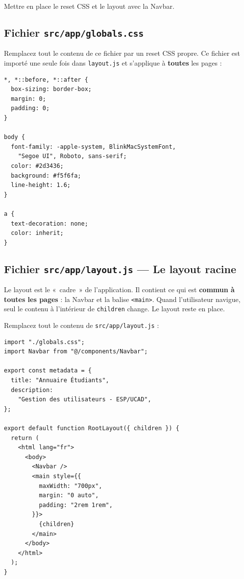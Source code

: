 \documentclass[11pt,a4paper]{article}
\begin{document}
\begin{objectifbox}
Mettre en place le reset CSS et le layout avec la Navbar.
\end{objectifbox}

\subsection{Fichier \texttt{src/app/globals.css}}

Remplacez tout le contenu de ce fichier par un reset CSS propre. Ce fichier est importé une seule fois dans \texttt{layout.js} et s'applique à \textbf{toutes} les pages :

\begin{lstlisting}[style=css]
*, *::before, *::after {
  box-sizing: border-box;
  margin: 0;
  padding: 0;
}

body {
  font-family: -apple-system, BlinkMacSystemFont,
    "Segoe UI", Roboto, sans-serif;
  color: #2d3436;
  background: #f5f6fa;
  line-height: 1.6;
}

a {
  text-decoration: none;
  color: inherit;
}
\end{lstlisting}

\subsection{Fichier \texttt{src/app/layout.js} --- Le layout racine}

Le layout est le «~cadre~» de l'application. Il contient ce qui est \textbf{commun à toutes les pages} : la Navbar et la balise \texttt{<main>}. Quand l'utilisateur navigue, seul le contenu à l'intérieur de \texttt{children} change. Le layout reste en place.

Remplacez tout le contenu de \texttt{src/app/layout.js} :

\begin{lstlisting}
import "./globals.css";
import Navbar from "@/components/Navbar";

export const metadata = {
  title: "Annuaire Étudiants",
  description:
    "Gestion des utilisateurs - ESP/UCAD",
};

export default function RootLayout({ children }) {
  return (
    <html lang="fr">
      <body>
        <Navbar />
        <main style={{
          maxWidth: "700px",
          margin: "0 auto",
          padding: "2rem 1rem",
        }}>
          {children}
        </main>
      </body>
    </html>
  );
}
\end{lstlisting}
\end{document}
